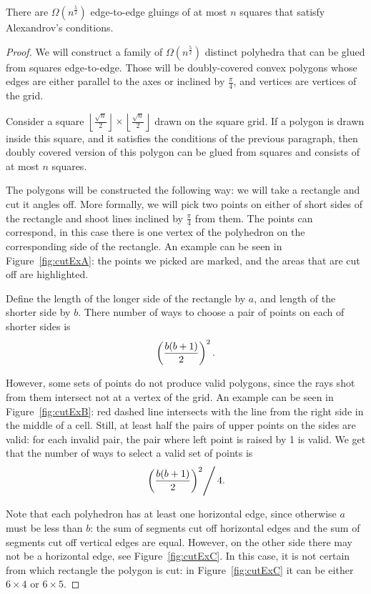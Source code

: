 \documentclass[a4paper,11pt]{article}
\begin{document}
\begin{theorem}
	There are $\Omega \left( n^{\frac52} \right)$ edge-to-edge gluings of at most $n$ squares that satisfy Alexandrov's conditions.
\end{theorem}

\begin{proof}
We will construct a family of $\Omega \left( n^{\frac52} \right)$ distinct polyhedra that can be glued from squares edge-to-edge. Those will be doubly-covered convex polygons whose edges are either parallel to the axes or inclined by $\frac{\pi}{4}$, and vertices are vertices of the grid.

Consider a square $\left \lfloor \frac{\sqrt n}{2} \right \rfloor \times \left \lfloor \frac{\sqrt n}{2} \right \rfloor$ drawn on the square grid. If a polygon is drawn inside this square, and it satisfies the conditions of the previous paragraph, then doubly covered version of this polygon can be glued from squares and consists of at most $n$ squares.

The polygons will be constructed the following way: we will take a rectangle and cut it angles off. More formally, we will pick two points on either of short sides of the rectangle and shoot lines inclined by $\frac{\pi}{4}$ from them. The points can correspond, in this case there is one vertex of the polyhedron on the corresponding side of the rectangle. An example can be seen in Figure~\ref{fig:cutExA}: the points we picked are marked, and the areas that are cut off are highlighted.



Define the length of the longer side of the rectangle by $a$, and length of the shorter side by $b$. There number of ways to choose a pair of points on each of shorter sides is
\[ \left( \frac{b(b+1)}{2} \right)^2. \]

However, some sets of points do not produce valid polygons, since the rays shot from them intersect not at a vertex of the grid. An example can be seen in Figure~\ref{fig:cutExB}: red dashed line intersects with the line from the right side in the middle of a cell. Still, at least half the pairs of upper points on the sides are valid: for each invalid pair, the pair where left point is raised by 1 is valid. We get that the number of ways to select a valid set of points is
\[ \left. \left( \frac{b(b+1)}{2} \right)^2 \right/ 4 . \]

Note that each polyhedron has at least one horizontal edge, since otherwise $a$ must be less than $b$: the sum of segments cut off horizontal edges and the sum of segments cut off vertical edges are equal. However, on the other side there may not be a horizontal edge, see Figure~\ref{fig:cutExC}. In this case, it is not certain from which rectangle the polygon is cut: in Figure~\ref{fig:cutExC} it can be either $6 \times 4$ or $6 \times 5$.


\end{proof}
\end{document}
